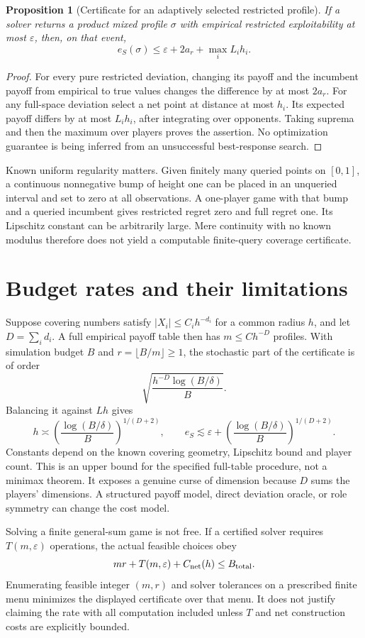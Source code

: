 \documentclass[11pt]{article}
\newtheorem{proposition}{Proposition}
\begin{document}
\begin{proposition}[Certificate for an adaptively selected restricted profile]
If a solver returns a product mixed profile $\sigma$ with empirical restricted exploitability at most $\varepsilon$, then, on that event,
\[
 e_S(\sigma)\leq\varepsilon+2a_r+\max_i L_i h_i.
\]
\end{proposition}
\begin{proof}
For every pure restricted deviation, changing its payoff and the incumbent payoff from empirical to true values changes the difference by at most $2a_r$. For any full-space deviation select a net point at distance at most $h_i$. Its expected payoff differs by at most $L_i h_i$, after integrating over opponents. Taking suprema and then the maximum over players proves the assertion. No optimization guarantee is being inferred from an unsuccessful best-response search.
\end{proof}

Known uniform regularity matters. Given finitely many queried points on $[0,1]$, a continuous nonnegative bump of height one can be placed in an unqueried interval and set to zero at all observations. A one-player game with that bump and a queried incumbent gives restricted regret zero and full regret one. Its Lipschitz constant can be arbitrarily large. Mere continuity with no known modulus therefore does not yield a computable finite-query coverage certificate.

\section*{Budget rates and their limitations}
Suppose covering numbers satisfy $|X_i|\leq C_i h^{-d_i}$ for a common radius $h$, and let $D=\sum_i d_i$. A full empirical payoff table then has $m\leq C h^{-D}$ profiles. With simulation budget $B$ and $r=\lfloor B/m\rfloor\geq1$, the stochastic part of the certificate is of order
\[
 \sqrt{\frac{h^{-D}\log(B/\delta)}B}.
\]
Balancing it against $Lh$ gives
\[
 h\asymp\left(\frac{\log(B/\delta)}B\right)^{1/(D+2)},\qquad
 e_S\lesssim\varepsilon+
 \left(\frac{\log(B/\delta)}B\right)^{1/(D+2)}.
\]
Constants depend on the known covering geometry, Lipschitz bound and player count. This is an upper bound for the specified full-table procedure, not a minimax theorem. It exposes a genuine curse of dimension because $D$ sums the players' dimensions. A structured payoff model, direct deviation oracle, or role symmetry can change the cost model.

Solving a finite general-sum game is not free. If a certified solver requires $T(m,\varepsilon)$ operations, the actual feasible choices obey
\[
 mr+T(m,\varepsilon)+C_{\rm net}(h)\leq B_{\rm total}.
\]
Enumerating feasible integer $(m,r)$ and solver tolerances on a prescribed finite menu minimizes the displayed certificate over that menu. It does not justify claiming the rate with all computation included unless $T$ and net construction costs are explicitly bounded.
\end{document}
